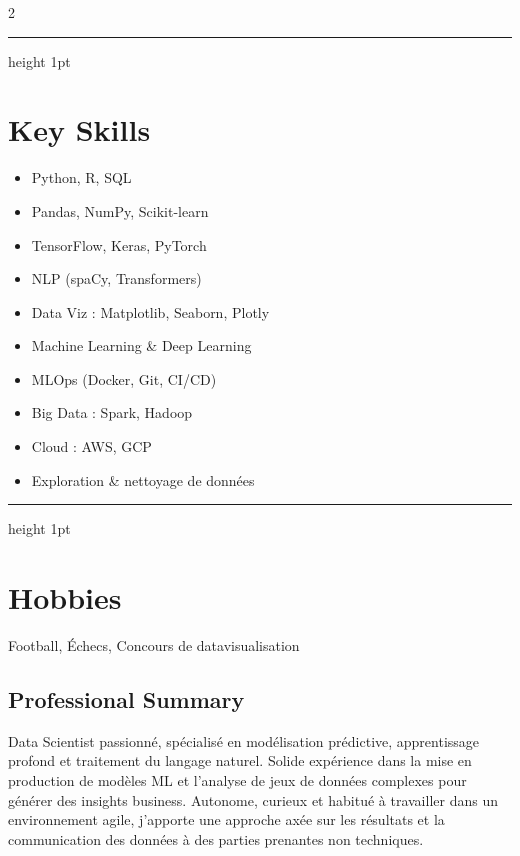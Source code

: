 \documentclass[10pt,letterpaper]{article}
\newcommand{\cvHr}{\vspace{0.5\baselineskip}\hrule height 1pt\color{primary}\vspace{0.7\baselineskip}}
\begin{document}
\begin{paracol}{2}
\begin{leftcolumn}
\cvHr

\section*{Key Skills}
\begin{itemize}
  \item Python, R, SQL
  \item Pandas, NumPy, Scikit-learn
  \item TensorFlow, Keras, PyTorch
  \item NLP (spaCy, Transformers)
  \item Data Viz : Matplotlib, Seaborn, Plotly
  \item Machine Learning \& Deep Learning
  \item MLOps (Docker, Git, CI/CD)
  \item Big Data : Spark, Hadoop
  \item Cloud : AWS, GCP
  \item Exploration & nettoyage de données
\end{itemize}

\cvHr

\section*{Hobbies}
Football, Échecs, Concours de datavisualisation

\end{leftcolumn}

\begin{rightcolumn}

\section*{Professional Summary}
Data Scientist passionné, spécialisé en modélisation prédictive, apprentissage profond et traitement du langage naturel.  
Solide expérience dans la mise en production de modèles ML et l’analyse de jeux de données complexes pour générer des insights business.  
Autonome, curieux et habitué à travailler dans un environnement agile, j’apporte une approche axée sur les résultats et la communication des données à des parties prenantes non techniques.

\vspace{1in}


\end{rightcolumn}
\end{paracol}
\end{document}
